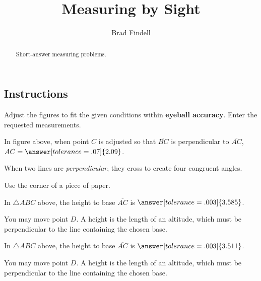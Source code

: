 \documentclass[nooutcomes]{ximera}
\title{Measuring by Sight}
\author{Brad Findell}
\begin{document}
\begin{abstract}
Short-answer measuring problems. 
\end{abstract}
\maketitle

\subsection*{Instructions}
Adjust the figures to fit the given conditions within \textbf{eyeball accuracy}.  Enter the requested measurements.  

\begin{problem}
\begin{center}  
\end{center}
In figure above, when point $C$ is adjusted so that $\overline{BC}$ is perpendicular to $\overline{AC}$, $AC=\answer[tolerance=.07]{2.09}$.
\begin{hint}
When two lines are \emph{perpendicular}, they cross to create four congruent angles. 
\end{hint}
\begin{hint}
Use the corner of a piece of paper.
\end{hint}
\end{problem}

\begin{problem}
\begin{center}  
\end{center}
In $\triangle ABC$ above, the height to base $\overline{AC}$ is $\answer[tolerance=.003]{3.585}$.
\begin{hint}
You may move point $D$.  A height is the length of an altitude, which must be perpendicular to the line containing the chosen base.  
\end{hint}
\end{problem}

\begin{problem}
\begin{center}  
\end{center}
In $\triangle ABC$ above, the height to base $\overline{AC}$ is $\answer[tolerance=.003]{3.511}$.
\begin{hint}
You may move point $D$.  A height is the length of an altitude, which must be perpendicular to the line containing the chosen base.  
\end{hint}
\end{problem}
\end{document}
